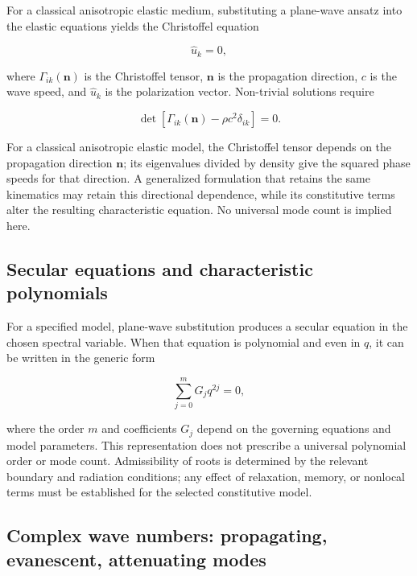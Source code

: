 For a classical anisotropic elastic medium, substituting a plane-wave ansatz into the elastic equations yields the Christoffel equation

\begin{equation}
[\Gamma_{ik}(\bm{n}) - \rho c^2 \delta_{ik}]\hat{u}_k = 0,
\label{eq:8.2}
\end{equation}

where $\Gamma_{ik}(\bm{n})$ is the Christoffel tensor, $\bm{n}$ is the propagation direction, $c$ is the wave speed, and $\hat{u}_k$ is the polarization vector. Non-trivial solutions require

\begin{equation}
\det[\Gamma_{ik}(\bm{n}) - \rho c^2 \delta_{ik}] = 0.
\label{eq:8.3}
\end{equation}

For a classical anisotropic elastic model, the Christoffel tensor depends on the propagation direction $\bm{n}$; its eigenvalues divided by density give the squared phase speeds for that direction. A generalized formulation that retains the same kinematics may retain this directional dependence, while its constitutive terms alter the resulting characteristic equation. No universal mode count is implied here.

\subsection{Secular equations and characteristic polynomials}
\label{sec:8.3}

For a specified model, plane-wave substitution produces a secular equation in the chosen spectral variable. When that equation is polynomial and even in $q$, it can be written in the generic form

\begin{equation}
\sum_{j=0}^{m} G_j q^{2j}=0,
\label{eq:8.4}
\end{equation}

where the order $m$ and coefficients $G_j$ depend on the governing equations and model parameters. This representation does not prescribe a universal polynomial order or mode count. Admissibility of roots is determined by the relevant boundary and radiation conditions; any effect of relaxation, memory, or nonlocal terms must be established for the selected constitutive model.

\subsection{Complex wave numbers: propagating, evanescent, attenuating modes}
\label{sec:8.4}

